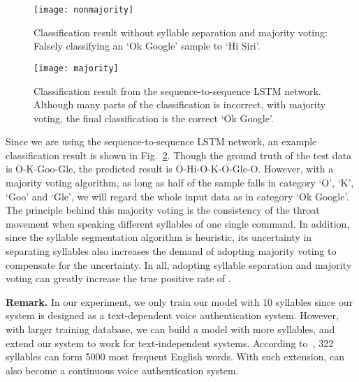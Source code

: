 \begin{figure}[t]
	\centering
		\centering
		\texttt{[image: nonmajority]}
		\caption{Classification result without syllable separation and majority voting: Falsely classifying an `Ok Google' sample to `Hi Siri'.}
		\label{fig:nonmajority}
\end{figure}
\begin{figure}[t]
		\centering
		\texttt{[image: majority]}
		\caption[Classification Result]{Classification result from the sequence-to-sequence LSTM network. Although many parts of the classification is incorrect, with majority voting, the final classification is the correct `Ok Google'. }
		\label{fig:majority}
\end{figure}


Since we are using the sequence-to-sequence LSTM network, an example classification result is shown in Fig.~\ref{fig:majority}. Though the ground truth of the test data is O-K-Goo-Gle, the predicted result is O-Hi-O-K-O-Gle-O. However, with a majority voting algorithm, as long as half of the sample falls in category `O', `K', `Goo' and `Gle', we will regard the whole input data as in category `Ok Google'. The principle behind this majority voting is the consistency of the throat movement when speaking different syllables of one single command. In addition, since the syllable segmentation algorithm is heuristic, its uncertainty in separating syllables also increases the demand of adopting majority voting to compensate for the uncertainty.
In all, adopting syllable separation and majority voting can greatly increase the true positive rate of {\shortname}.  



\textbf{Remark.} In our experiment, we only train our model with 10 syllables since our system is designed as a text-dependent voice authentication system. However, with larger training database, we can build a model with more syllables, and extend our system to work for text-independent systems. According to~\cite{onlinelist}, 322 syllables can form 5000 most frequent English words. With such extension, {\shortname} can also become a continuous voice authentication system.


